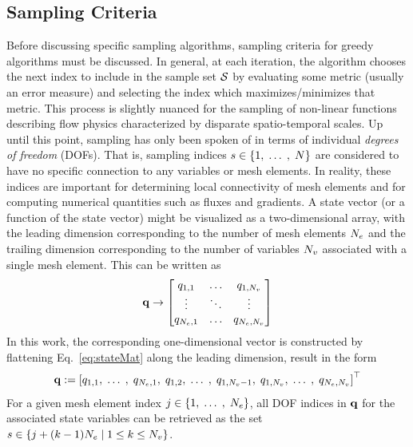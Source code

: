 \subsection{Sampling Criteria}
%
Before discussing specific sampling algorithms, sampling criteria for greedy algorithms must be discussed. In general, at each iteration, the algorithm chooses the next index to include in the sample set $\mathcal{S}$ by evaluating some metric (usually an error measure) and selecting the index which maximizes/minimizes that metric. This process is slightly nuanced for the sampling of non-linear functions describing flow physics characterized by disparate spatio-temporal scales. Up until this point, sampling has only been spoken of in terms of individual \textit{degrees of freedom} (DOFs). That is, sampling indices $s \in \{1,\; \hdots \;, \; N\}$ are considered to have no specific connection to any variables or mesh elements. In reality, these indices are important for determining local connectivity of mesh elements and for computing numerical quantities such as fluxes and gradients. A state vector (or a function of the state vector) might be visualized as a two-dimensional array, with the leading dimension corresponding to the number of mesh elements $N_{e}$ and the trailing dimension corresponding to the number of variables $N_{v}$ associated with a single mesh element. This can be written as
%
\begin{equation}\label{eq:stateMat}
	\mathbf{q} \rightarrow
	\begin{bmatrix}
		q_{1,1} & \hdots & q_{1,N_{v}} \\
		\vdots & \ddots & \vdots \\
		q_{N_{e},1} & \hdots & q_{N_{e},N_{v}}
	\end{bmatrix}
\end{equation}
%
In this work, the corresponding one-dimensional vector is constructed by flattening Eq.~\ref{eq:stateMat} along the leading dimension, result in the form
%
\begin{equation}
	\mathbf{q} := \left[q_{1,1}, \; \hdots \;, \; q_{N_{e},1}, \; q_{1,2}, \; \hdots \;, \; q_{1,N_{v}-1}, \; q_{1,N_{v}}, \; \hdots \;, \; q_{N_{e},N_{v}} \right]^\top
\end{equation}
%
For a given mesh element index $j \in \{1,\; \hdots \;,\; N_{e}\}$, all DOF indices in $\mathbf{q}$ for the associated state variables can be retrieved as the set $s \in \{j + (k-1) N_{e} \; \vert \; 1 \le k \le N_{v} \}$.

